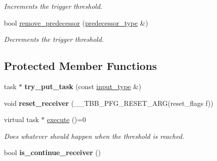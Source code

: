 \begin{DoxyCompactItemize}
\begin{DoxyCompactList}\small\item\em Increments the trigger threshold. \end{DoxyCompactList}\item 
bool \hyperlink{classtbb_1_1flow_1_1interface7_1_1continue__receiver_aea58a2200f20acd9cda829ba6958b22a}{remove\+\_\+predecessor} (\hyperlink{classtbb_1_1flow_1_1interface7_1_1continue__receiver_a86d210b5614d47aaa43731b7e303751f}{predecessor\+\_\+type} \&)
\begin{DoxyCompactList}\small\item\em Decrements the trigger threshold. \end{DoxyCompactList}\end{DoxyCompactItemize}
\subsection*{Protected Member Functions}
\begin{DoxyCompactItemize}
\item 
\hypertarget{classtbb_1_1flow_1_1interface7_1_1continue__receiver_a67b19ab95b89f43e6033d8d124cc84be}{}task $\ast$ {\bfseries try\+\_\+put\+\_\+task} (const \hyperlink{classtbb_1_1flow_1_1interface7_1_1continue__receiver_a7474ed0edad2bb26d9f86065ecf2c93d}{input\+\_\+type} \&)\label{classtbb_1_1flow_1_1interface7_1_1continue__receiver_a67b19ab95b89f43e6033d8d124cc84be}

\item 
\hypertarget{classtbb_1_1flow_1_1interface7_1_1continue__receiver_af777c0ca7aff9c98aa2c8179a485613d}{}void {\bfseries reset\+\_\+receiver} (\+\_\+\+\_\+\+T\+B\+B\+\_\+\+P\+F\+G\+\_\+\+R\+E\+S\+E\+T\+\_\+\+A\+R\+G(reset\+\_\+flags f))\label{classtbb_1_1flow_1_1interface7_1_1continue__receiver_af777c0ca7aff9c98aa2c8179a485613d}

\item 
virtual task $\ast$ \hyperlink{classtbb_1_1flow_1_1interface7_1_1continue__receiver_adf70ce80d67a565d04e029da461bbe72}{execute} ()=0
\begin{DoxyCompactList}\small\item\em Does whatever should happen when the threshold is reached. \end{DoxyCompactList}\item 
\hypertarget{classtbb_1_1flow_1_1interface7_1_1continue__receiver_aa0372ce2435ae0f97c2db34af185e6f7}{}bool {\bfseries is\+\_\+continue\+\_\+receiver} ()\label{classtbb_1_1flow_1_1interface7_1_1continue__receiver_aa0372ce2435ae0f97c2db34af185e6f7}

\end{DoxyCompactItemize}
